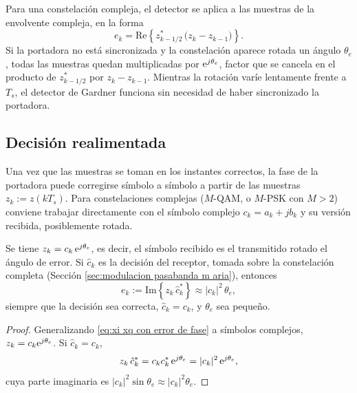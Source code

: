 \begin{remark}\label{nota:gardner fase}
Para una constelación compleja, el detector se aplica a las muestras de la envolvente compleja, en la forma
\begin{equation*}
    e_k = \mathrm{Re}\left\{z_{k-1/2}^*\,\big(z_k-z_{k-1}\big)\right\}.
\end{equation*}
Si la portadora no está sincronizada y la constelación aparece rotada un ángulo $\theta_e$, todas las muestras quedan multiplicadas por $\mathrm{e}^{j\theta_e}$, factor que se cancela en el producto de $z_{k-1/2}^*$ por $z_k-z_{k-1}$. Mientras la rotación varíe lentamente frente a $T_s$, el detector de Gardner funciona sin necesidad de haber sincronizado la portadora.
\end{remark}

\subsection{Decisión realimentada}\label{sec:decision directed}

Una vez que las muestras se toman en los instantes correctos, la fase de la portadora puede corregirse símbolo a símbolo a partir de las muestras $z_k := z(kT_s)$. Para constelaciones complejas ($M$-QAM, o $M$-PSK con $M>2$) conviene trabajar directamente con el símbolo complejo $c_k=a_k+jb_k$ y su versión recibida, posiblemente rotada.

\begin{proposicion}\label{prop:decision directed}
Se tiene $z_k = c_k\,\mathrm{e}^{j\theta_e}$, es decir, el símbolo recibido es el transmitido rotado el ángulo de error. Si $\hat c_k$ es la decisión del receptor, tomada sobre la constelación completa (Sección \ref{sec:modulacion pasabanda m aria}), entonces
\begin{equation}\label{eq:error decision directed}
    e_k := \mathrm{Im}\left\{z_k\, \hat c_k^*\right\} \approx |c_k|^2\,\theta_e,
\end{equation}
siempre que la decisión sea correcta, $\hat c_k=c_k$, y $\theta_e$ sea pequeño.
\end{proposicion}
\begin{proof}
Generalizando \eqref{eq:xi xq con error de fase} a símbolos complejos, $z_k=c_k\mathrm{e}^{j\theta_e}$. Si $\hat c_k= c_k$,
\begin{equation*}
    z_k\,\hat c_k^* = c_k c_k^*\,\mathrm{e}^{j\theta_e} = |c_k|^2\,\mathrm{e}^{j\theta_e},
\end{equation*}
cuya parte imaginaria es $|c_k|^2\sin\theta_e\approx|c_k|^2\theta_e$.
\end{proof}

